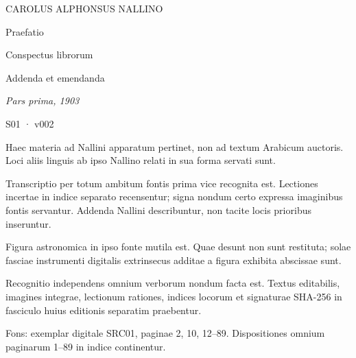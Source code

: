 \documentclass[11pt]{article}
\begin{document}
\hypertarget{S01-v002-EDITORIAL-NOTICE}{}
\vspace*{25mm}
\begin{center}
{\fontsize{11}{15}\selectfont{} CAROLUS ALPHONSUS NALLINO\par}
\vspace{12mm}
{\fontsize{25}{34}\selectfont Praefatio\par Conspectus librorum\par Addenda et emendanda\par}
\vspace{10mm}
{\fontsize{12}{17}\selectfont\itshape Pars prima, 1903\par}
\vspace{18mm}
{\fontsize{10}{14}\selectfont S01 · v002\par}
\end{center}
\vspace{12mm}
\fontsize{11}{16}\selectfont
Haec materia ad Nallini apparatum pertinet, non ad textum Arabicum auctoris.
Loci aliis linguis ab ipso Nallino relati in sua forma servati sunt.\par\medskip
Transcriptio per totum ambitum fontis prima vice recognita est.
Lectiones incertae in indice separato recensentur; signa nondum certo expressa
imaginibus fontis servantur. Addenda Nallini describuntur, non tacite locis prioribus inseruntur.\par\medskip
Figura astronomica in ipso fonte mutila est. Quae desunt non sunt restituta;
solae fasciae instrumenti digitalis extrinsecus additae a figura exhibita abscissae sunt.\par\medskip
Recognitio independens omnium verborum nondum facta est.
Textus editabilis, imagines integrae, lectionum rationes, indices locorum et
signaturae SHA-256 in fasciculo huius editionis separatim praebentur.\par\medskip
Fons: exemplar digitale SRC01, paginae 2, 10, 12–89.
Dispositiones omnium paginarum 1–89 in indice continentur.
\end{document}
